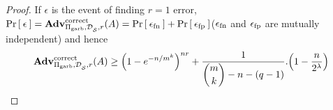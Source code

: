 \begin{proof}
If $\epsilon$ is the event of finding $r=1$ error, $\Pr\left[\: \epsilon \:\right] = \mathrm{\mathbf{Adv}}^{\mathrm{correct}}_{\Pi_{\mathrm{garb}},\mathcal{D}_{{\cal S}}^{},r}(A) =  \Pr\left[\: \epsilon_{\mathrm{fn}} \:\right] + \Pr\left[\: \epsilon_{\mathrm{fp}} \:\right]$($\epsilon_{\mathrm{fn}}$ and $\epsilon_{\mathrm{fp}}$ are mutually independent) and hence 
\[
\mathrm{\mathbf{Adv}}^{\mathrm{correct}}_{\Pi_{\mathrm{garb}},\mathcal{D}_{{\cal S}}^{},r}(A)  \geq \left(1 - e^{-n/m^k}\right)^{nr} + \dfrac{1}{\dbinom{m}{k}-n-(q-1)} . \Big(1-\dfrac{n}{2^\lambda}\Big)
\]

\end{proof}
